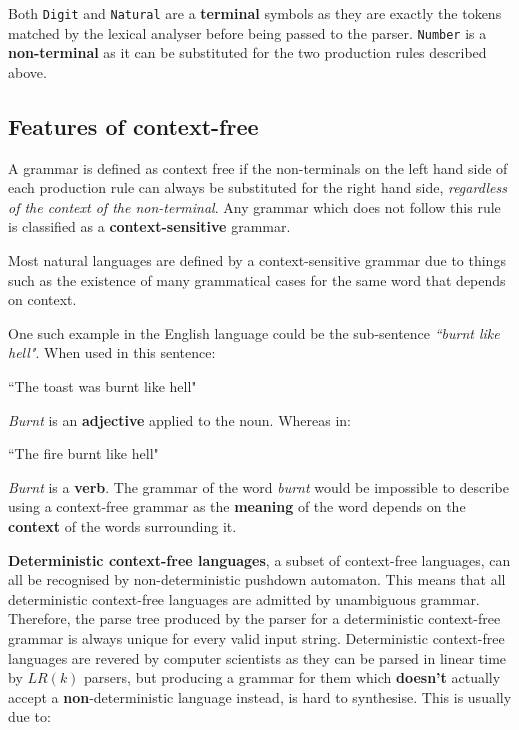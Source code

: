 \documentclass[12pt, letterpaper]{article}
\theoremstyle{definition}
\begin{document}
\pagebreak

Both \verb|Digit| and \verb|Natural| are a \textbf{terminal} symbols as they are exactly the tokens matched by the lexical analyser before being passed to the parser. \verb|Number| is a \textbf{non-terminal} as it can be substituted for the two production rules described above.

\subsection{Features of context-free}

A grammar is defined as context free if the non-terminals on the left hand side of each production rule can always be substituted for the right hand side, \textit{regardless of the context of the non-terminal}. Any grammar which does not follow this rule is classified as a \textbf{context-sensitive} grammar.

Most natural languages are defined by a context-sensitive grammar due to things such as the existence of many grammatical cases for the same word that depends on context.

One such example in the English language could be the sub-sentence \textit{``burnt like hell"}. When used in this sentence:

\begin{center}
    ``The toast was burnt like hell"
\end{center}

\textit{Burnt} is an \textbf{adjective} applied to the noun. Whereas in:

\begin{center}
    ``The fire burnt like hell"
\end{center}

\textit{Burnt} is a \textbf{verb}. The grammar of the word \textit{burnt} would be impossible to describe using a context-free grammar as the \textbf{meaning} of the word depends on the \textbf{context} of the words surrounding it.

\textbf{Deterministic context-free languages}, a subset of context-free languages, can all be recognised by non-deterministic pushdown automaton. This means that all deterministic context-free languages are admitted by unambiguous grammar. Therefore, the parse tree produced by the parser for a deterministic context-free grammar is always unique for every valid input string. Deterministic context-free languages are revered by computer scientists as they can be parsed in linear time by $LR(k)$ parsers, but producing a grammar for them which \textbf{doesn't} actually accept a \textbf{non}-deterministic language instead, is hard to synthesise. This is usually due to:
\end{document}
